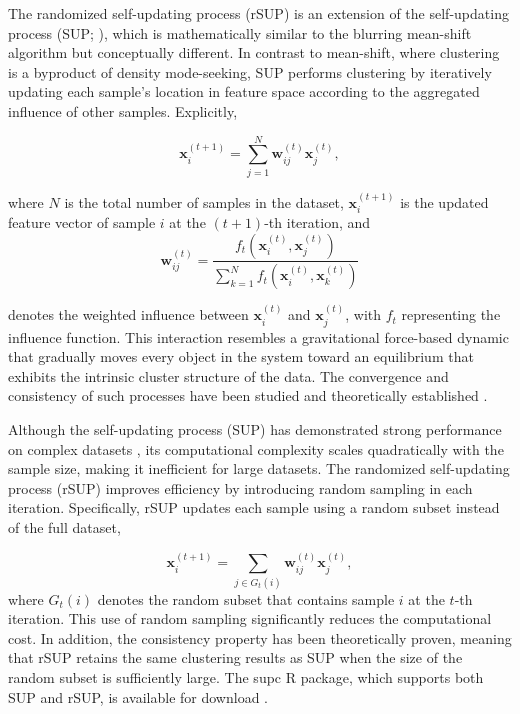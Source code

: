 \documentclass[11pt]{article}
\theoremstyle{plain}
\begin{document}
The randomized self-updating process (rSUP) is an extension of the self-updating process (SUP; \citealt{chen2007new}), which is mathematically similar to the blurring mean-shift algorithm \citep{cheng1995mean} but conceptually different. In contrast to mean-shift, where clustering is a byproduct of density mode-seeking, SUP performs clustering by iteratively updating each sample’s location in feature space according to the aggregated influence of other samples. Explicitly, 

\begin{equation}
\mathbf{x}_i^{(t+1)} = \sum_{j=1}^{N}  \mathbf{w}_{ij}^{(t)} \mathbf{x}_j^{(t)}, \nonumber
\end{equation}

\noindent where $N$ is the total number of samples in the dataset, $\mathbf{x}_i^{(t+1)}$ is the updated feature vector of sample $i$ at the $(t+1)$-th iteration, and 
\begin{equation}
\mathbf{w}_{ij}^{(t)}=\frac{f_t\left(\mathbf{x}_i^{(t)}, \mathbf{x}_j^{(t)}\right)}{\sum_{k=1}^{N} f_t\left(\mathbf{x}_i^{(t)}, \mathbf{x}_k^{(t)}\right)} \nonumber
\end{equation}

\noindent denotes the weighted influence between $\mathbf{x}_i^{(t)}$ and $\mathbf{x}_j^{(t)}$, with $f_t$ representing the influence function. This interaction resembles a gravitational force-based dynamic that gradually moves every object in the system toward an equilibrium that exhibits the intrinsic cluster structure of the data. The convergence and consistency of such processes have been studied and theoretically established \citep{chen2015convergence,chen2025mean}.

Although the self-updating process (SUP) has demonstrated strong performance on complex datasets \citep{shiu2016strengths}, its computational complexity scales quadratically with the sample size, making it inefficient for large datasets. The randomized self-updating process (rSUP) improves efficiency by introducing random sampling in each iteration. Specifically, rSUP updates each sample using a random subset instead of the full dataset, 

\begin{equation}
\mathbf{x}_i^{(t+1)} = \sum_{j \in G_t(i)}  \mathbf{w}_{ij}^{(t)} \mathbf{x}_j^{(t)}, \nonumber
\end{equation}
where $ G_t(i)$ denotes the random subset that contains sample $i$ at the $t$-th iteration. This use of random sampling significantly reduces the computational cost. In addition, the consistency property has been theoretically proven, meaning that rSUP retains the same clustering results as SUP when the size of the random subset is sufficiently large. The supc R package, which supports both SUP and rSUP, is available for download \citep{supc}.
\end{document}
